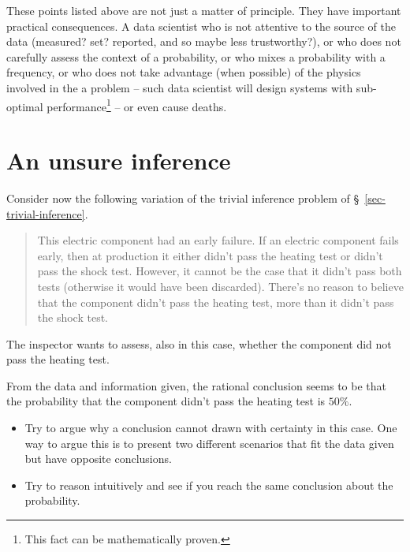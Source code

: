 \documentclass[
  a4paper,
  DIV=11,
  numbers=noendperiod,
  oneside]{scrreprt}
\providecommand{\tightlist}{%
  \setlength{\itemsep}{0pt}\setlength{\parskip}{0pt}}\usepackage{longtable,booktabs,array}
\begin{document}
\hfill\break

These points listed above are not just a matter of principle. They have
important practical consequences. A data scientist who is not attentive
to the source of the data (measured? set? reported, and so maybe less
trustworthy?), or who does not carefully assess the context of a
probability, or who mixes a probability with a frequency, or who does
not take advantage (when possible) of the physics involved in the a
problem -- such data scientist will design systems with sub-optimal
performance\footnote{This fact can be mathematically proven.} -- or even
cause deaths.

\hypertarget{an-unsure-inference}{%
\section{An unsure inference}\label{an-unsure-inference}}

Consider now the following variation of the trivial inference problem of
§~\ref{sec-trivial-inference}.

\begin{quote}
This electric component had an early failure. If an electric component
fails early, then at production it either didn't pass the heating test
or didn't pass the shock test. However, it cannot be the case that it
didn't pass both tests (otherwise it would have been discarded). There's
no reason to believe that the component didn't pass the heating test,
more than it didn't pass the shock test.
\end{quote}

The inspector wants to assess, also in this case, whether the component
did not pass the heating test.

From the data and information given, the rational conclusion seems to be
that the probability that the component didn't pass the heating test is
\(50\%\).

\begin{tcolorbox}[enhanced jigsaw, colback=white, titlerule=0mm, toptitle=1mm, breakable, colbacktitle=quarto-callout-caution-color!10!white, opacitybacktitle=0.6, colframe=quarto-callout-caution-color-frame, opacityback=0, arc=.35mm, leftrule=.75mm, title={\faIcon{pen} Exercises}, left=2mm, bottomtitle=1mm, rightrule=.15mm, bottomrule=.15mm, toprule=.15mm, coltitle=black]

\begin{itemize}
\tightlist
\item
  Try to argue why a conclusion cannot drawn with certainty in this
  case. One way to argue this is to present two different scenarios that
  fit the data given but have opposite conclusions.
\item
  Try to reason intuitively and see if you reach the same conclusion
  about the probability.
\end{itemize}

\end{tcolorbox}
\end{document}
